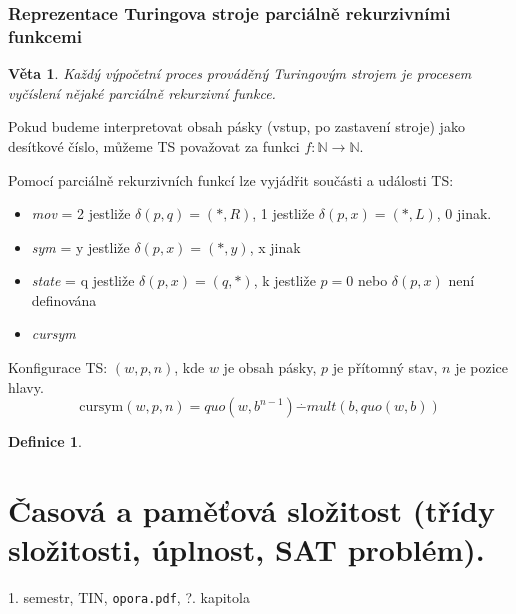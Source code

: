 \documentclass[a4paper, 11pt]{report}
\newtheorem{mydef}{Definice}[chapter]
\newtheorem{veta}{Věta}[chapter]
\begin{document}
\subsection{Reprezentace Turingova stroje parciálně rekurzivními funkcemi}
\begin{veta}
Každý výpočetní proces prováděný Turingovým strojem je procesem vyčíslení nějaké parciálně rekurzivní funkce.
\end{veta}
Pokud budeme interpretovat obsah pásky (vstup, po zastavení stroje) jako desítkové číslo, můžeme TS považovat za funkci $f: \mathbb{N} \to \mathbb{N}$.

Pomocí parciálně rekurzivních funkcí lze vyjádřit součásti a události TS:
\begin{itemize}
	\item \emph{mov} = 2 jestliže $\delta(p, q) = (*, R)$, 1 jestliže $\delta(p, x) = (*, L)$, 0 jinak.
	\item \emph{sym} = y jestliže $\delta(p, x) = (*, y)$, x jinak
	\item \emph{state} = q jestliže $\delta(p, x) = (q, *)$, k jestliže $p=0$ nebo $\delta(p, x)$ není definována
	\item \emph{cursym}
\end{itemize}
Konfigurace TS: $(w, p, n)$, kde $w$ je obsah pásky, $p$ je přítomný stav, $n$ je pozice hlavy.
$$\text{cursym}(w, p, n) = quo(w, b^{n-1}) \overset{\cdot}{-} mult(b, quo(w, b))$$

\begin{mydef}
\end{mydef}















\chapter{Časová a paměťová složitost (třídy složitosti, úplnost, SAT problém).} \label{cha:25}
1. semestr, TIN, \texttt{opora.pdf}, ?. kapitola

\end{document}
